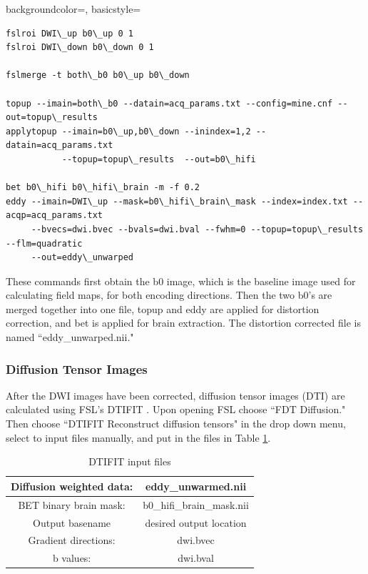 {
    backgroundcolor=\color{white},
    basicstyle=\scriptsize\color{black}\ttfamily
}

\begin{lstlisting}[style=DOS]
fslroi DWI\_up b0\_up 0 1
fslroi DWI\_down b0\_down 0 1

fslmerge -t both\_b0 b0\_up b0\_down

topup --imain=both\_b0 --datain=acq_params.txt --config=mine.cnf --out=topup\_results
applytopup --imain=b0\_up,b0\_down --inindex=1,2 --datain=acq_params.txt
           --topup=topup\_results  --out=b0\_hifi

bet b0\_hifi b0\_hifi\_brain -m -f 0.2
eddy --imain=DWI\_up --mask=b0\_hifi\_brain\_mask --index=index.txt --acqp=acq_params.txt
     --bvecs=dwi.bvec --bvals=dwi.bval --fwhm=0 --topup=topup\_results --flm=quadratic
     --out=eddy\_unwarped

\end{lstlisting}

These commands first obtain the b0 image, which is the baseline image used for calculating field maps, for both encoding directions. Then the two b0's are merged together into one file, topup and eddy are applied for distortion correction, and bet is applied for brain extraction. The distortion corrected file is named ``eddy\_unwarped.nii."

\subsubsection{Diffusion Tensor Images}

After the DWI images have been corrected, diffusion tensor images (DTI) are calculated using FSL's DTIFIT \cite{ref:dtifit}. Upon opening FSL choose ``FDT Diffusion." Then choose ``DTIFIT Reconstruct diffusion tensors" in the drop down menu, select to input files manually, and put in the files in Table \ref{tab:dtifit}.

\begin{table}[H]
\centering
\caption{DTIFIT input files}
\label{tab:dtifit}
\begin{tabular}{|c|c|}
\hline
Diffusion weighted data: & eddy\_unwarmed.nii        \\ \hline
BET binary brain mask:   & b0\_hifi\_brain\_mask.nii \\ \hline
Output basename          & desired output location   \\ \hline
Gradient directions:     & dwi.bvec                  \\ \hline
b values:                & dwi.bval                  \\ \hline
\end{tabular}
\end{table}

